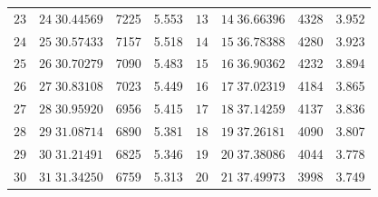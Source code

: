 \begin{center}
\begin{tabular}{|r|r|r|r||r|r|r|r|}
\(23\)&\(24\;30.44569\)&7225&5.553&\(13\)&\(14\;36.66396\)&4328&3.952\\
\(24\)&\(25\;30.57433\)&7157&5.518&\(14\)&\(15\;36.78388\)&4280&3.923\\
\(25\)&\(26\;30.70279\)&7090&5.483&\(15\)&\(16\;36.90362\)&4232&3.894\\
\(26\)&\(27\;30.83108\)&7023&5.449&\(16\)&\(17\;37.02319\)&4184&3.865\\
\(27\)&\(28\;30.95920\)&6956&5.415&\(17\)&\(18\;37.14259\)&4137&3.836\\
\(28\)&\(29\;31.08714\)&6890&5.381&\(18\)&\(19\;37.26181\)&4090&3.807\\
\(29\)&\(30\;31.21491\)&6825&5.346&\(19\)&\(20\;37.38086\)&4044&3.778\\
\(30\)&\(31\;31.34250\)&6759&5.313&\(20\)&\(21\;37.49973\)&3998&3.749\\
\hline
\end{tabular}
\end{center}
\endgroup
